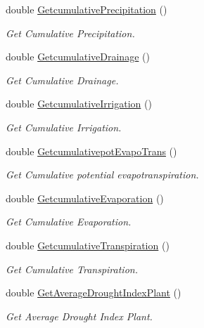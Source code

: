 \begin{DoxyCompactItemize}
double \mbox{\hyperlink{class_crop_class_a0676d46f97d4a0a5e8f48721611b2184}{Getcumulative\+Precipitation}} ()
\begin{DoxyCompactList}\small\item\em Get Cumulative Precipitation. \end{DoxyCompactList}\item 
double \mbox{\hyperlink{class_crop_class_a6d1f5ebe9d9f9c5e218f2ebaeb9dd959}{Getcumulative\+Drainage}} ()
\begin{DoxyCompactList}\small\item\em Get Cumulative Drainage. \end{DoxyCompactList}\item 
double \mbox{\hyperlink{class_crop_class_a744025c0a7e2f951975d59a4fa49a5e7}{Getcumulative\+Irrigation}} ()
\begin{DoxyCompactList}\small\item\em Get Cumulative Irrigation. \end{DoxyCompactList}\item 
double \mbox{\hyperlink{class_crop_class_a949f4be661243a2809af653cead177e1}{Getcumulativepot\+Evapo\+Trans}} ()
\begin{DoxyCompactList}\small\item\em Get Cumulative potential evapotranspiration. \end{DoxyCompactList}\item 
double \mbox{\hyperlink{class_crop_class_a07f500e6b248c2c073140b44e4e4d8c7}{Getcumulative\+Evaporation}} ()
\begin{DoxyCompactList}\small\item\em Get Cumulative Evaporation. \end{DoxyCompactList}\item 
double \mbox{\hyperlink{class_crop_class_a4fc23e5a31457a2f088ab6ffcb394fa2}{Getcumulative\+Transpiration}} ()
\begin{DoxyCompactList}\small\item\em Get Cumulative Transpiration. \end{DoxyCompactList}\item 
double \mbox{\hyperlink{class_crop_class_aa859e71adecc03738e986fb81d0396ea}{Get\+Average\+Drought\+Index\+Plant}} ()
\begin{DoxyCompactList}\small\item\em Get Average Drought Index Plant. \end{DoxyCompactList}\item 
\mbox{\label{class_crop_class_add2e8db24ef3c2fa6d1fdbe5ba617097}} 

\end{DoxyCompactItemize}
